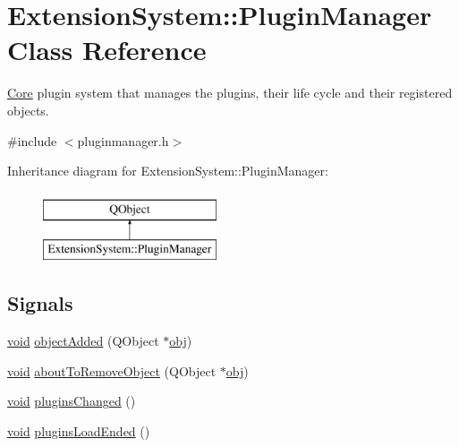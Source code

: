 \hypertarget{class_extension_system_1_1_plugin_manager}{\section{Extension\-System\-:\-:Plugin\-Manager Class Reference}
\label{class_extension_system_1_1_plugin_manager}
}


\hyperlink{namespace_core}{Core} plugin system that manages the plugins, their life cycle and their registered objects.  




{\ttfamily \#include $<$pluginmanager.\-h$>$}

Inheritance diagram for Extension\-System\-:\-:Plugin\-Manager\-:\begin{figure}[H]
\begin{center}
\leavevmode
\includegraphics[height=2.000000cm]{class_extension_system_1_1_plugin_manager}
\end{center}
\end{figure}
\subsection*{Signals}
\begin{DoxyCompactItemize}
\item 
\hyperlink{group___u_a_v_objects_plugin_ga444cf2ff3f0ecbe028adce838d373f5c}{void} \hyperlink{class_extension_system_1_1_plugin_manager_a6b4756c3e225d230d653fc4b17e75333}{object\-Added} (Q\-Object $\ast$\hyperlink{glext_8h_a0c0d4701a6c89f4f7f0640715d27ab26}{obj})
\item 
\hyperlink{group___u_a_v_objects_plugin_ga444cf2ff3f0ecbe028adce838d373f5c}{void} \hyperlink{class_extension_system_1_1_plugin_manager_ad8bb981cb3c0d59af87244cdc5807d35}{about\-To\-Remove\-Object} (Q\-Object $\ast$\hyperlink{glext_8h_a0c0d4701a6c89f4f7f0640715d27ab26}{obj})
\item 
\hyperlink{group___u_a_v_objects_plugin_ga444cf2ff3f0ecbe028adce838d373f5c}{void} \hyperlink{class_extension_system_1_1_plugin_manager_ae3beea101f4f0ade4bef0a2ba0995ebc}{plugins\-Changed} ()
\item 
\hyperlink{group___u_a_v_objects_plugin_ga444cf2ff3f0ecbe028adce838d373f5c}{void} \hyperlink{class_extension_system_1_1_plugin_manager_afb03a4a58ac4629332ca26b4eb519748}{plugins\-Load\-Ended} ()
\end{DoxyCompactItemize}
